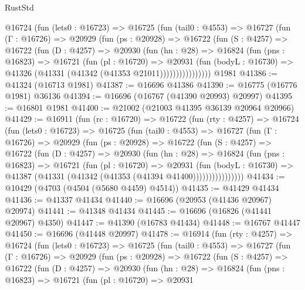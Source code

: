 \begin{lexlean}{RustStd}
\begin{coremodule}
        @16724
          (fun (lets0 : @16723) =>
          @16725
            (fun (tail0 : @4553) =>
            @16727
              (fun (Γ : @16726) =>
              @20929
                (fun (ps : @20928) =>
                @16722
                  (fun (S : @4257) =>
                  @16722
                    (fun (D : @4257) =>
                    @20930
                      (fun (hn : @28) =>
                      @16824
                        (fun (pns : @16823) =>
                        @16721
                          (fun (pl : @16720) =>
                          @20931
                            (fun (bodyL : @16730) =>
                            @41326 (@41331 (@41342 (@41353 @21011))))))))))))))))
    @1981
@41386 := @41324 (@16713 @1981)
@41387 := @16696 @41386
@41390 := @16775 (@16776 @1981) @36136
@41394 := @16696 (@16767 (@41390 @20993) @20997)
@41395 := @16801 @1981
@41400 := @21002 (@21003 @41395 @36139 @20964 @20966)
@41429 := @16911
    (fun (rc : @16720) =>
    @16722
      (fun (rty : @4257) =>
      @16724
        (fun (lets0 : @16723) =>
        @16725
          (fun (tail0 : @4553) =>
          @16727
            (fun (Γ : @16726) =>
            @20929
              (fun (ps : @20928) =>
              @16722
                (fun (S : @4257) =>
                @16722
                  (fun (D : @4257) =>
                  @20930
                    (fun (hn : @28) =>
                    @16824
                      (fun (pns : @16823) =>
                      @16721
                        (fun (pl : @16720) =>
                        @20931
                          (fun (bodyL : @16730) =>
                          @41387 (@41331 (@41342 (@41353 (@41394 @41400))))))))))))))))
@41434 := @10429 (@4703 (@4504 (@5680 @4459) @4514))
@41435 := @41429 @41434
@41436 := @41337 @41434
@41440 := @16696 (@20953 (@41436 @20967) @20974)
@41441 := @41348 @41434
@41445 := @16696 (@16826 (@41441 @20967) @4350)
@41447 := @41390 (@16783 @41434)
@41448 := @16767 @41447
@41450 := @16696 (@41448 @20997)
@41478 := @16914
    (fun (rty : @4257) =>
    @16724
      (fun (lets0 : @16723) =>
      @16725
        (fun (tail0 : @4553) =>
        @16727
          (fun (Γ : @16726) =>
          @20929
            (fun (ps : @20928) =>
            @16722
              (fun (S : @4257) =>
              @16722
                (fun (D : @4257) =>
                @20930
                  (fun (hn : @28) =>
                  @16824
                    (fun (pns : @16823) =>
                    @16721
                      (fun (pl : @16720) =>
                      @20931

\end{coremodule}
\end{lexlean}
